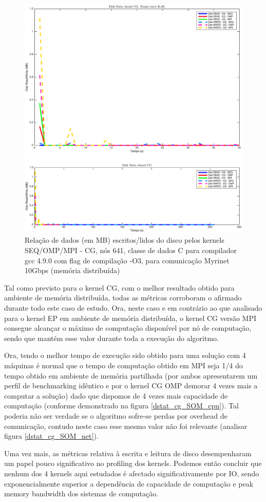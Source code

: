 \documentclass[conference,compsoc]{IEEEtran}
\begin{document}
\begin{figure}[H]
\centering
\includegraphics[width=1.1\columnwidth]{EPS/dstat_CG_seq_vs_omp_vs_mpi/disk.eps}
\caption{Relação de dados (em MB) escritos/lidos do disco pelos kernels SEQ/OMP/MPI - CG, nós 641, classe de dados C para compilador gcc 4.9.0 com flag de compilação  -O3, para comunicação Myrinet 10Gbps (memória distribuída)}
\label{dstat_cg_SOM_disk}
\end{figure}

Tal como previsto para o kernel CG, com o melhor resultado obtido para ambiente de memória distribuída, todas as métricas corroboram o afirmado durante todo este caso de estudo. Ora, neste caso e em contrário ao que analisado para o kernel EP em ambiente de memória distribuída, o kernel CG versão MPI consegue alcançar o máximo de computação disponível por nó de computação, sendo que mantém esse valor durante toda a execução do algoritmo. \par
Ora, tendo o melhor tempo de execução sido obtido para uma solução com 4 máquinas é normal que o tempo de computação obtido em MPI seja 1/4 do tempo obtido em ambiente de memória partilhada (por ambos apresentarem um perfil de benchmarking idêntico e por o kernel CG OMP demorar 4 vezes mais a computar a solução) dado que dispomos de 4 vezes mais capacidade de computação (conforme demonstrado na figura \ref{dstat_cg_SOM_cpu}). Tal poderia não ser verdade se o algoritmo sofre-se perdas por overhead de comunicação, contudo neste caso esse mesmo valor não foi relevante (analisar figura \ref{dstat_cg_SOM_net}). 
\par 
Uma vez mais, as métricas relativa à escrita e leitura de disco desempenharam um papel pouco significativo no profiling dos kernels. Podemos então concluir que nenhum dos 4 kernels aqui estudados é afectado significativamente por IO, sendo exponencialmente superior a dependência de capacidade de computação e peak memory bandwidth dos sistemas de computação.
\end{document}
